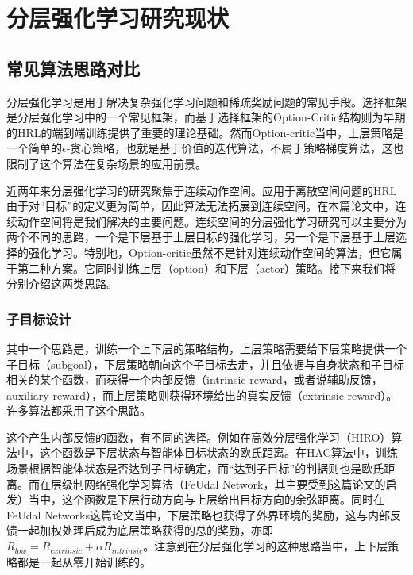 \section{分层强化学习研究现状}
\subsection{常见算法思路对比}
分层强化学习是用于解决复杂强化学习问题和稀疏奖励问题的常见手段\cite{Sutton:1999}\cite{HRL_with_maxQ}\cite{FUN}\cite{Barto_HRL}。选择框架\cite{Sutton:1998_options}\cite{Sutton:1999}是分层强化学习中的一个常见框架，而基于选择框架的Option-Critic结构\cite{option-critic}则为早期的HRL的端到端训练提供了重要的理论基础。然而Option-critic当中，上层策略是一个简单的$\epsilon$-贪心策略，也就是基于价值的迭代算法，不属于策略梯度算法，这也限制了这个算法在复杂场景的应用前景。

近两年来分层强化学习的研究聚焦于连续动作空间。应用于离散空间问题的HRL由于对``目标''的定义更为简单，因此算法无法拓展到连续空间。在本篇论文中，连续动作空间将是我们解决的主要问题。连续空间的分层强化学习研究可以主要分为两个不同的思路，一个是下层基于上层目标的强化学习，另一个是下层基于上层选择的强化学习。特别地，Option-critic虽然不是针对连续动作空间的算法，但它属于第二种方案。它同时训练上层（option）和下层（actor）策略。接下来我们将分别介绍这两类思路。

\subsubsection{子目标设计}
其中一个思路是，训练一个上下层的策略结构，上层策略需要给下层策略提供一个子目标（subgoal），下层策略朝向这个子目标去走，并且依据与自身状态和子目标相关的某个函数，而获得一个内部反馈（intrinsic reward，或者说辅助反馈，auxiliary reward），而上层策略则获得环境给出的真实反馈（extrinsic reward）。许多算法都采用了这个思路\cite{Sutton:1999}\cite{Tenenbaum2016NIPS}\cite{HIRO}\cite{HAC}\cite{feudal}。

这个产生内部反馈的函数，有不同的选择。例如在高效分层强化学习（HIRO\cite{HIRO}）算法中，这个函数是下层状态与智能体目标状态的欧氏距离。在HAC\cite{HAC}算法中，训练场景根据智能体状态是否达到子目标确定，而``达到子目标''的判据则也是欧氏距离。而在层级制网络强化学习算法（FeUdal Network\cite{feudal}，其主要受到\cite{FUN}这篇论文的启发）当中，这个函数是下层行动方向与上层给出目标方向的余弦距离。同时在FeUdal Networks这篇论文当中，下层策略也获得了外界环境的奖励，这与内部反馈一起加权处理后成为底层策略获得的总的奖励，亦即$R_{low} = R_{extrinsic} + \alpha R_{intrinsic}$。注意到在分层强化学习的这种思路当中，上下层策略都是一起从零开始训练的。

